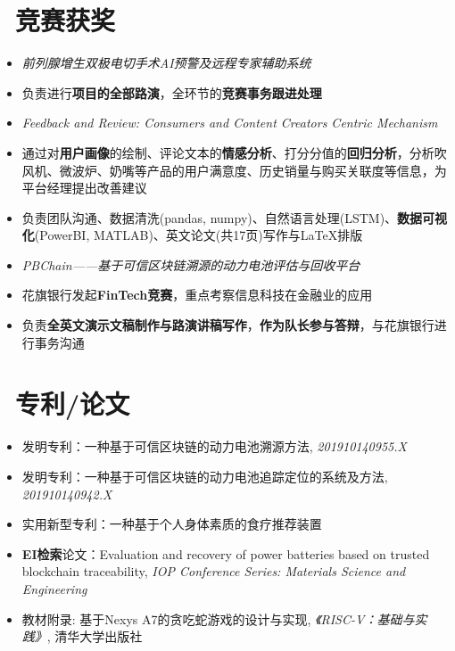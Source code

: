\documentclass{resume}
\begin{document}
\section{\faTrophy\ 竞赛获奖}
\begin{itemize}
  \item \textit{前列腺增生双极电切手术AI预警及远程专家辅助系统}
  \item 负责进行\textbf{项目的全部路演}，全环节的\textbf{竞赛事务跟进处理}%
\end{itemize}

\begin{itemize}
  \item \textit{Feedback and Review: Consumers and Content Creators Centric Mechanism}%
  \item 通过对\textbf{用户画像}的绘制、评论文本的\textbf{情感分析}、打分分值的\textbf{回归分析}，分析吹风机、微波炉、奶嘴等产品的用户满意度、历史销量与购买关联度等信息，为平台经理提出改善建议
  \item 负责团队沟通、数据清洗(pandas, numpy)、自然语言处理(LSTM)、\textbf{数据可视化}(PowerBI, MATLAB)、英文论文(共17页)写作与LaTeX排版
 \end{itemize}
 
 \begin{itemize}
   \item \textit{PBChain——基于可信区块链溯源的动力电池评估与回收平台}
   \item 花旗银行发起\textbf{FinTech竞赛}，重点考察信息科技在金融业的应用
   \item 负责\textbf{全英文演示文稿制作与路演讲稿写作}，\textbf{作为队长参与答辩}，与花旗银行进行事务沟通
 \end{itemize}

\section{\faBook\ 专利/论文}
\begin{itemize}[parsep=0.2ex]
  \item 发明专利：一种基于可信区块链的动力电池溯源方法, \textit{201910140955.X}
  \item 发明专利：一种基于可信区块链的动力电池追踪定位的系统及方法, \textit{201910140942.X}
  \item 实用新型专利：一种基于个人身体素质的食疗推荐装置
  \item \textbf{EI检索}论文：Evaluation and recovery of power batteries based on trusted blockchain traceability, \textit{IOP Conference Series: Materials Science and Engineering}
  \item 教材附录: 基于Nexys A7的贪吃蛇游戏的设计与实现, \textit{《RISC-V：基础与实践》}, 清华大学出版社
\end{itemize}
\end{document}
